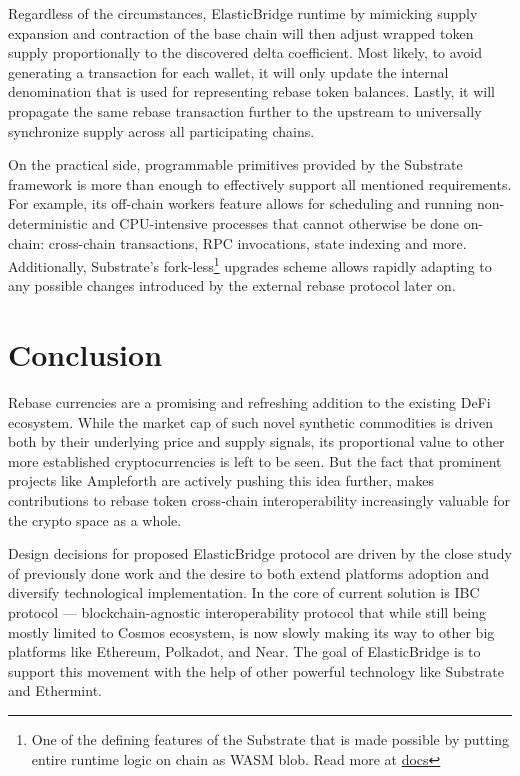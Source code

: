 \documentclass{article}
\begin{document}
Regardless of the circumstances, ElasticBridge runtime by mimicking supply expansion and contraction of the base chain will then adjust wrapped token supply proportionally to the discovered delta coefficient. Most likely, to avoid generating a transaction for each wallet, it will only update the internal denomination that is used for representing rebase token balances. Lastly, it will propagate the same rebase transaction further to the upstream to universally synchronize supply across all participating chains.

On the practical side, programmable primitives provided by the Substrate framework is more than enough to effectively support all mentioned requirements. For example, its off-chain workers feature allows for scheduling and running non-deterministic and CPU-intensive processes that cannot otherwise be done on-chain: cross-chain transactions, RPC invocations, state indexing and more. Additionally, Substrate's fork-less\footnote{One of the defining features of the Substrate that is made possible by putting entire runtime logic on chain as WASM blob. Read more at \href{https://docs.substrate.io/tutorials/v3/forkless-upgrades/}{docs}} upgrades scheme allows rapidly adapting to any possible changes introduced by the external rebase protocol later on.

\section{Conclusion}

Rebase currencies are a promising and refreshing addition to the existing DeFi ecosystem. While the market cap of such novel synthetic commodities is driven both by their underlying price and supply signals, its proportional value to other more established cryptocurrencies is left to be seen. But the fact that prominent projects like Ampleforth are actively pushing this idea further, makes contributions to rebase token cross-chain interoperability increasingly valuable for the crypto space as a whole.

Design decisions for proposed ElasticBridge protocol are driven by the close study of previously done work and the desire to both extend platforms adoption and diversify technological implementation. In the core of current solution is IBC protocol --- blockchain-agnostic interoperability protocol that while still being mostly limited to Cosmos ecosystem, is now slowly making its way to other big platforms like Ethereum, Polkadot, and Near. The goal of ElasticBridge is to support this movement with the help of other powerful technology like Substrate and Ethermint.
\end{document}
